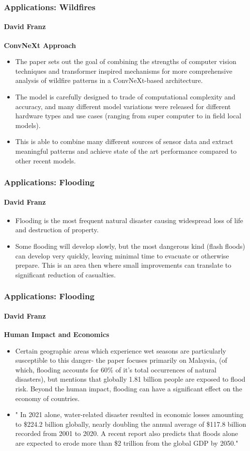 \documentclass{beamer}
\newcommand{\namedframe}[3]{
  \begin{frame}
    \frametitle{#2}
    \framesubtitle{#1}
    #3
  \end{frame}
}
\begin{document}
\namedframe{David Franz}{Applications: Wildfires}{
  \textbf{ConvNeXt Approach}
    \begin{itemize}
        \item The paper sets out the goal of combining the strengths of computer vision techniques and transformer inspired mechanisms for more comprehensive analysis of wildfire patterns in a ConvNeXt-based architecture. 
        \item The model is carefully designed to trade of computational complexity and accuracy, and many different model variations were released for different hardware types and use cases (ranging from super computer to in field local models).
        \item         This is able to combine many different sources of sensor data and extract meaningful patterns and achieve state of the art performance compared to other recent models.
    \end{itemize}
}

\namedframe{David Franz}{Applications: Flooding}{
    \begin{itemize}
        \item Flooding is the most frequent natural disaster causing widespread loss of life and destruction of property. 
        \item Some flooding will develop slowly, but the most dangerous kind (flash floods) can develop very quickly, leaving minimal time to evacuate or otherwise prepare. This is an area then where small improvements can translate to significant reduction of casualties. 
    \end{itemize}
}

\namedframe{David Franz}{Applications: Flooding}{
\textbf{Human Impact and Economics}
    \begin{itemize}

        \item Certain geographic areas which experience wet seasons are particularly susceptible to this danger- the paper focuses primarily on Malaysia, (of which, flooding accounts for 60\% of it's total occurrences of natural disasters), but mentions that globally 1.81 billion people are exposed to flood risk. Beyond the human impact, flooding can have a significant effect on the economy of countries.
        \item " In 2021 alone, water-related disaster resulted in economic losses amounting to \$224.2 billion  globally, nearly doubling the annual average of \$117.8 billion recorded from 2001 to 2020. A recent report also predicts that floods alone are expected to erode more than \$2 trillion from the global GDP by 2050."

    \end{itemize}
}
\end{document}

